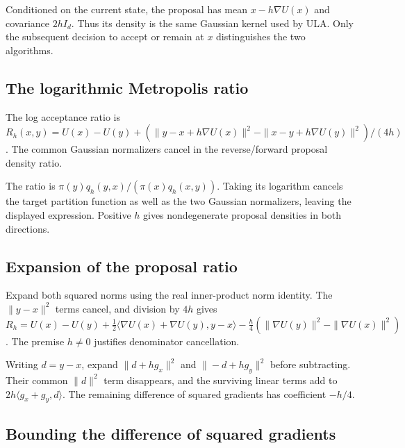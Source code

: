 \documentclass[11pt,a4paper]{report}
\begin{document}
Conditioned on the current state, the proposal has mean \(x-h\nabla U(x)\) and covariance \(2hI_d\). Thus its density is the same Gaussian kernel used by ULA. Only the subsequent decision to accept or remain at \(x\) distinguishes the two algorithms.

\subsection{\texorpdfstring{The logarithmic Metropolis ratio}{The logarithmic Metropolis ratio}}
\label{report-step-UnadjustedLangevin-MALAError-lean-2}


The log acceptance ratio is \(R_h(x,y)=U(x)-U(y)+(\|y-x+h\nabla U(x)\|^2-\|x-y+h\nabla U(y)\|^2)/(4h)\). The common Gaussian normalizers cancel in the reverse/\allowbreak{}forward proposal density ratio.



The ratio is \(\pi(y)q_h(y,x)/(\pi(x)q_h(x,y))\). Taking its logarithm cancels the target partition function as well as the two Gaussian normalizers, leaving the displayed expression. Positive \(h\) gives nondegenerate proposal densities in both directions.

\subsection{\texorpdfstring{Expansion of the proposal ratio}{Expansion of the proposal ratio}}
\label{report-step-UnadjustedLangevin-MALAError-lean-3}


Expand both squared norms using the real inner-product norm identity. The \(\|y-x\|^2\) terms cancel, and division by \(4h\) gives \(R_h=U(x)-U(y)+\frac12\langle\nabla U(x)+\nabla U(y),y-x\rangle-\frac h4(\|\nabla U(y)\|^2-\|\nabla U(x)\|^2)\). The premise \(h\ne0\) justifies denominator cancellation.



Writing \(d=y-x\), expand \(\|d+hg_x\|^2\) and \(\|-d+hg_y\|^2\) before subtracting. Their common \(\|d\|^2\) term disappears, and the surviving linear terms add to \(2h\langle g_x+g_y,d\rangle\). The remaining difference of squared gradients has coefficient \(-h/4\).

\subsection{\texorpdfstring{Bounding the difference of squared gradients}{Bounding the difference of squared gradients}}
\label{report-step-UnadjustedLangevin-MALAError-lean-4}
\end{document}
